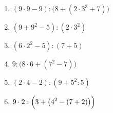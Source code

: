 \begin{enumerate}
\renewcommand{\labelenumi}{\textbf{\arabic{enumi})}}
\setlength{\itemsep}{0pt}
\medmuskip=4mu\thickmuskip=5mu
\item $\displaystyle (9\cdot 9-9):\bigl(8+(2\cdot 3^{3}+7)\bigr)$
\par\vspace{3cm}
\item $\displaystyle (9+9^{2}-5):(2\cdot 3^{2})$
\par\vspace{3cm}
\item $\displaystyle (6\cdot 2^{2}-5):(7+5)$
\par\vspace{3cm}
\item $\displaystyle 9:\bigl(8\cdot 6+(7^{2}-7)\bigr)$
\par\vspace{3cm}
\item $\displaystyle (2\cdot 4-2):(9+5^{2}:5)$
\par\vspace{3cm}
\item $\displaystyle 9\cdot 2:\Bigl(3+\bigl(4^{2}-(7+2)\bigr)\Bigr)$
\par\vspace{3cm}
\end{enumerate}
